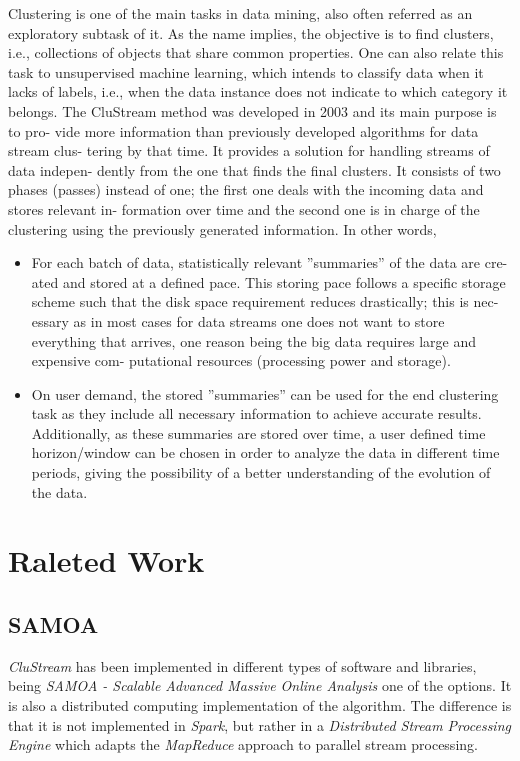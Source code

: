 \documentclass[10pt, conference, compsocconf]{IEEEtran}
\begin{document}
Clustering is one of the main tasks in data mining, also often referred as an
exploratory subtask of it. As the name implies, the objective is to find clusters, i.e.,
collections of objects that share common properties. One can also relate this task
to unsupervised machine learning, which intends to classify data when it lacks of
labels, i.e., when the data instance does not indicate to which category it belongs.
The CluStream method was developed in 2003 \cite{clustreamOrig} and its main purpose is to pro-
vide more information than previously developed algorithms for data stream clus-
tering by that time. It provides a solution for handling streams of data indepen-
dently from the one that finds the final clusters. It consists of two phases (passes)
instead of one; the first one deals with the incoming data and stores relevant in-
formation over time and the second one is in charge of the clustering using the
previously generated information. In other words,
\begin{itemize}
 \item For each batch of data, statistically relevant ”summaries” of the data are cre-
ated and stored at a defined pace. This storing pace follows a specific storage
scheme such that the disk space requirement reduces drastically; this is nec-
essary as in most cases for data streams one does not want to store everything
that arrives, one reason being the big data requires large and expensive com-
putational resources (processing power and storage).
\item On user demand, the stored ”summaries” can be used for the end clustering
task as they include all necessary information to achieve accurate results.
Additionally, as these summaries are stored over time, a user defined time
horizon/window can be chosen in order to analyze the data in different time
periods, giving the possibility of a better understanding of the evolution of
the data.
\end{itemize}

\section{Raleted Work}
\subsection{SAMOA}

\textit{CluStream} has been implemented in different types of software and libraries, being \textit{SAMOA - Scalable Advanced Massive Online Analysis} one of the options. It is also a distributed computing implementation of the algorithm. The difference is that it is not implemented in \textit{Spark}, but rather in a \textit{Distributed Stream Processing Engine} which adapts the \textit{MapReduce} approach to parallel stream processing\cite{samoa}.
\end{document}
